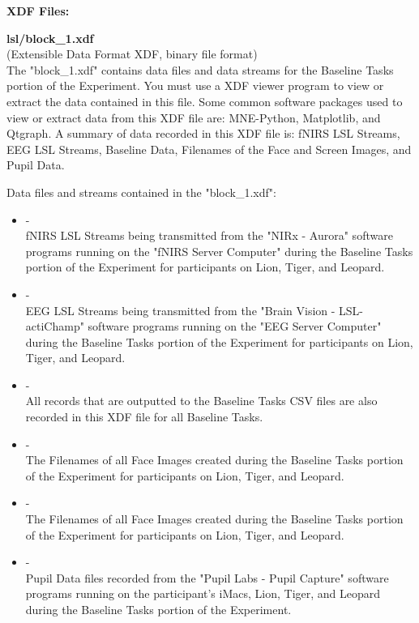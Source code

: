 \begin{description}
\bigskip\item\textbf{XDF Files:}
\medskip
\item\textbf{lsl/block\_1.xdf}\\(Extensible Data Format XDF, binary file format)\\
The "block\_1.xdf" contains data files and data streams for the Baseline Tasks portion of the Experiment. You must use a XDF viewer program to view or extract the data contained in this file. Some common software packages used to view or extract data from this XDF file are: MNE-Python, Matplotlib, and Qtgraph. A summary of data recorded in this XDF file is: fNIRS LSL Streams, EEG LSL Streams, Baseline Data, Filenames of the Face and Screen Images, and Pupil Data.

Data files and streams contained in the "block\_1.xdf":
\begin{itemize}
    \item {} -\\fNIRS LSL Streams being transmitted from the "NIRx - Aurora" software programs running on the "fNIRS Server Computer" during the Baseline Tasks portion of the Experiment for participants on Lion, Tiger, and Leopard.
    \item {} -\\EEG LSL Streams being transmitted from the "Brain Vision - LSL-actiChamp" software programs running on the "EEG Server Computer" during the Baseline Tasks portion of the Experiment for participants on Lion, Tiger, and Leopard.
    \item {} -\\All records that are outputted to the Baseline Tasks CSV files are also recorded in this XDF file for all Baseline Tasks.
    \item {} -\\The Filenames of all Face Images created during the Baseline Tasks portion of the Experiment for participants on Lion, Tiger, and Leopard.
    \item {} -\\The Filenames of all Face Images created during the Baseline Tasks portion of the Experiment for participants on Lion, Tiger, and Leopard.
    \item {} -\\Pupil Data files recorded from the "Pupil Labs - Pupil Capture" software programs running on the participant's iMacs, Lion, Tiger, and Leopard during the Baseline Tasks portion of the Experiment.
\end{itemize}



\end{description}
